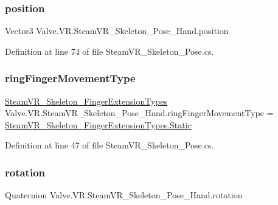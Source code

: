 \subsubsection{\texorpdfstring{position}{position}}
{\footnotesize\ttfamily Vector3 Valve.\+V\+R.\+Steam\+V\+R\+\_\+\+Skeleton\+\_\+\+Pose\+\_\+\+Hand.\+position}



Definition at line 74 of file Steam\+V\+R\+\_\+\+Skeleton\+\_\+\+Pose.\+cs.

\mbox{\label{class_valve_1_1_v_r_1_1_steam_v_r___skeleton___pose___hand_aba7575cade0e516ea2265066e02c1e89}} 
\subsubsection{\texorpdfstring{ringFingerMovementType}{ringFingerMovementType}}
{\footnotesize\ttfamily \mbox{\hyperlink{namespace_valve_1_1_v_r_af4f7ce87893374f71b2fa2ba112642da}{Steam\+V\+R\+\_\+\+Skeleton\+\_\+\+Finger\+Extension\+Types}} Valve.\+V\+R.\+Steam\+V\+R\+\_\+\+Skeleton\+\_\+\+Pose\+\_\+\+Hand.\+ring\+Finger\+Movement\+Type = \mbox{\hyperlink{namespace_valve_1_1_v_r_af4f7ce87893374f71b2fa2ba112642daa84a8921b25f505d0d2077aeb5db4bc16}{Steam\+V\+R\+\_\+\+Skeleton\+\_\+\+Finger\+Extension\+Types.\+Static}}}



Definition at line 47 of file Steam\+V\+R\+\_\+\+Skeleton\+\_\+\+Pose.\+cs.

\mbox{\label{class_valve_1_1_v_r_1_1_steam_v_r___skeleton___pose___hand_a08578472e61f788eb40dc2c7f0e9d533}} 
\subsubsection{\texorpdfstring{rotation}{rotation}}
{\footnotesize\ttfamily Quaternion Valve.\+V\+R.\+Steam\+V\+R\+\_\+\+Skeleton\+\_\+\+Pose\+\_\+\+Hand.\+rotation}




